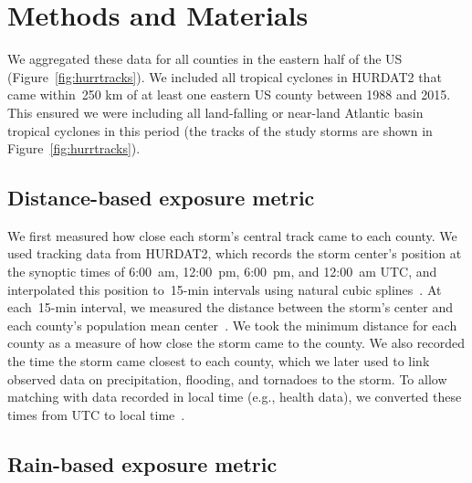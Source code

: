 \section*{Methods and Materials}

We aggregated these data for all counties in the eastern half of the \ac{US}
(Figure~\ref{fig:hurrtracks}).  We included all tropical cyclones in
\ac{HURDAT2} \parencite{landsea2013} that came within~250 \si{\kilo\metre} of
at least one eastern \ac{US} county between 1988 and 2015.  This ensured we
were including all land-falling or near-land Atlantic basin tropical cyclones
in this period (the tracks of the study storms are shown in
Figure~\ref{fig:hurrtracks}).

\subsection*{Distance-based exposure metric}

We first measured how close each storm's central track came to each county. We
used tracking data from \ac{HURDAT2}, which records the storm center's position
at the synoptic times of 6:00~am, 12:00~pm, 6:00~pm, and 12:00~am \ac{UTC}, and
interpolated this position to~15-\si{\minute} intervals using natural cubic
splines~\parencite{hurricaneexposure}. At each~15-\si{\minute} interval, we
measured the distance between the storm's center and each county's population
mean center~\parencite{bivand2013applied, countycenters}. We took the minimum
distance for each county as a measure of how close the storm came to the
county.  We also recorded the time the storm came closest to each county, which
we later used to link observed data on precipitation, flooding, and tornadoes
to the storm.  To allow matching with data recorded in local time (e.g., health
data), we converted these times from \ac{UTC} to local
time~\parencite{countytimezones}.

\subsection*{Rain-based exposure metric}

